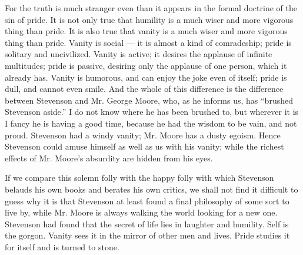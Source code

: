 For the truth is much stranger even than it appears in the formal doctrine of the sin of pride. It is not only true that humility is a much wiser and more vigorous thing than pride. It is also true that vanity is a much wiser and more vigorous thing than pride. Vanity is social — it is almost a kind of comradeship; pride is solitary and uncivilized. Vanity is active; it desires the applause of infinite multitudes; pride is passive, desiring only the applause of one person, which it already has. Vanity is humorous, and can enjoy the joke even of itself; pride is dull, and cannot even smile. And the whole of this difference is the difference between Stevenson and Mr. George Moore, who, as he informs us, has “brushed Stevenson aside.” I do not know where he has been brushed to, but wherever it is I fancy he is having a good time, because he had the wisdom to be vain, and not proud. Stevenson had a windy vanity; Mr. Moore has a dusty egoism. Hence Stevenson could amuse himself as well as us with his vanity; while the richest effects of Mr. Moore’s absurdity are hidden from his eyes.

If we compare this solemn folly with the happy folly with which Stevenson belauds his own books and berates his own critics, we shall not find it difficult to guess why it is that Stevenson at least found a final philosophy of some sort to live by, while Mr. Moore is always walking the world looking for a new one. Stevenson had found that the secret of life lies in laughter and humility. Self is the gorgon. Vanity sees it in the mirror of other men and lives. Pride studies it for itself and is turned to stone.


